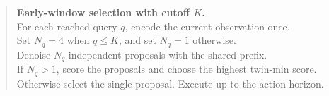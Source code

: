 \begin{quote}\small
\textbf{Early-window selection with cutoff \(K\).}\\
For each reached query \(q\), encode the current observation once.\\
Set \(N_q=4\) when \(q\le K\), and set \(N_q=1\) otherwise.\\
Denoise \(N_q\) independent proposals with the shared prefix.\\
If \(N_q>1\), score the proposals and choose the highest twin-min score.\\
Otherwise select the single proposal. Execute up to the action horizon.
\end{quote}
